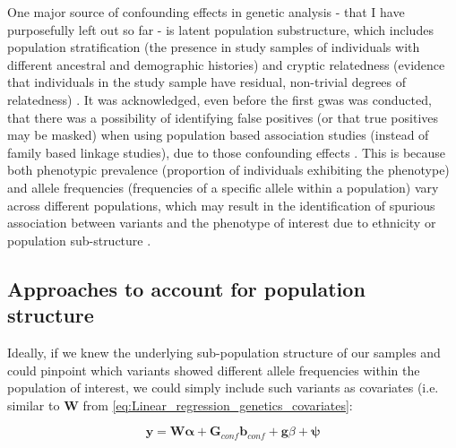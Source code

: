 One major source of confounding effects in genetic analysis - that I have purposefully left out so far -  is latent population substructure, which includes population stratification (the presence in study samples of individuals with different ancestral and demographic histories) and cryptic relatedness (evidence that individuals in the study sample have residual, non-trivial degrees of relatedness) \cite{mccarthy2008genome}.
It was acknowledged, even before the first \gls{gwas} was conducted, that there was a possibility of identifying false positives (or that true positives may be masked) when using population based association studies (instead of family based linkage studies), due to those confounding effects \cite{burton2005key}. 
This is because both phenotypic prevalence (proportion of individuals exhibiting the phenotype) and allele frequencies (frequencies of a specific allele within a population) vary across different populations, which may result in the identification of spurious association between variants and the phenotype of interest due to ethnicity or population sub-structure \cite{burton2005key}.


\subsection{Approaches to account for population structure}


Ideally, if we knew the underlying sub-population structure of our samples and could pinpoint which variants showed different allele frequencies within the population of interest, we could simply include such variants as covariates (i.e. similar to $\mathbf{W}$ from \eqref{eq:Linear_regression_genetics_covariates}:

\begin{equation}\label{eq:LM_G_confounding}
    \mathbf{y} =  \mathbf{W}\boldsymbol{\alpha} +  \mathbf{G}_{conf}\mathbf{b}_{conf} + \mathbf{g}\beta + \boldsymbol{\psi} 
\end{equation}

